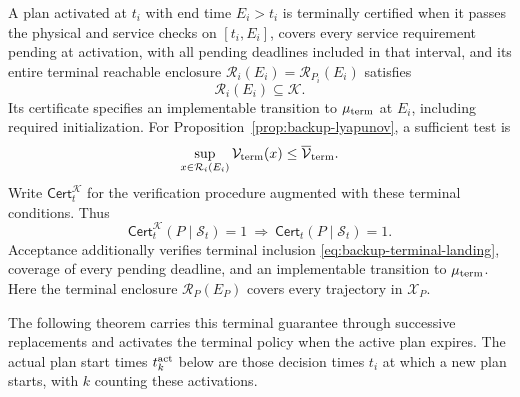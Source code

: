 \documentclass[final]{cas-sc}
\theoremstyle{definition}
\theoremstyle{plain}
\theoremstyle{definition}
\theoremstyle{plain}
\begin{document}
A plan activated at $t_i$ with end time $E_i>t_i$ is terminally certified
when it passes the physical and service checks on $[t_i,E_i]$, covers
every service requirement pending at activation, with all pending
deadlines included in that interval,
and its entire terminal reachable enclosure
$\mathcal R_i(E_i)=\mathcal R_{P_i}(E_i)$ satisfies
\begin{equation}
\mathcal R_i(E_i)\subseteq\mathcal K.
\label{eq:backup-terminal-landing}
\end{equation}
Its certificate specifies an implementable transition to $\mu_{\rm term}$ at
$E_i$, including required initialization. For
Proposition~\ref{prop:backup-lyapunov}, a sufficient test is
\begin{equation}
\sup_{x\in\mathcal R_i(E_i)}\mathcal V_{\rm term}(x)\le \overline{\mathcal V}_{\rm term}.
\label{eq:backup-computable-landing}
\end{equation}
Write $\mathsf{Cert}^{\mathcal K}_t$ for the verification procedure augmented with
these terminal conditions. Thus
\begin{equation}
\mathsf{Cert}^{\mathcal K}_t(P\mid\mathcal S_t)=1
\ \Longrightarrow\ \mathsf{Cert}_t(P\mid\mathcal S_t)=1.
\label{eq:terminal-checker}
\end{equation}
Acceptance additionally verifies terminal inclusion
\eqref{eq:backup-terminal-landing}, coverage of every pending deadline,
and an implementable transition to $\mu_{\rm term}$. Here the terminal enclosure
$\mathcal R_P(E_P)$ covers every trajectory in $\mathcal X_P$.

The following theorem carries this terminal guarantee through successive
replacements and activates the terminal policy when the active plan expires.
The actual plan start times $t_k^{\rm act}$ below are those decision times
$t_i$ at which a new plan starts, with $k$ counting these activations.
\end{document}
